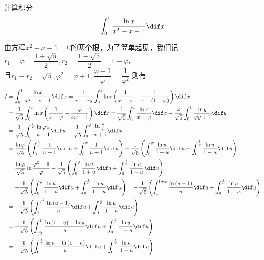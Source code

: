 \documentclass[color=green,titlestyle=hang]{elegantbook}%
\begin{document}
\newpage\begin{exercise}计算积分\[\int_{0}^{1}{\frac{\ln{x}}{x^2-x-1}\dif x}\]
\end{exercise}\begin{Solution}由方程$x^2-x-1=0$的两个根，为了简单起见，我们记\\
$r_{1}=\varphi=\dfrac{1+\sqrt{5}}{2},r_{2}=\dfrac{1-\sqrt{5}}{2}=1-\varphi$,\\
且$r_{1}-r_{2}=\sqrt{5},\varphi^{2}=\varphi+1 , \dfrac{\varphi-1}{\varphi}=\dfrac{1}{\varphi^{2}}$
则有
\begin{align*} 
I&=\int_{0}^{1}{\frac{\ln{x}}{x^2-x-1}\dif x}=\frac{1}{r_{1}-r_{2}}\int_{0}^{1}{\ln{x}\left(\frac{1}{x-\varphi}-\frac{1}{x-(1-\varphi)} \right)\dif x}\\ 
&=\dfrac{1}{\sqrt{5}}\int_{0}^{1}{\ln{x}\left(\frac{1}{x-\varphi}-\frac{\varphi}{\varphi x+1}\right)\dif x}=\dfrac{1}{\sqrt{5}}\int_{0}^{1}{\frac{\ln{x}}{x-\varphi}\dif x}-\frac{\varphi}{\sqrt{5}}\int_{0}^{1}{\frac{\ln{y}}{\varphi y+1}\dif y}\\ 
&=\frac{1}{\sqrt{5}}\int_{0}^{\frac{1}{\varphi}}{\frac{\ln{\varphi u}}{u-1}\dif u}-\frac{1}{\sqrt{5}}\int_{0}^{\varphi}{\frac{\ln{\frac{u}{\varphi}}}{u+1}\dif u}\\ 
&=\frac{\ln{\varphi}}{\sqrt{5}}\left(\int_{0}^{\frac{1}{\varphi}}{\frac{1}{u-1}\dif u}+\int_{0}^{\varphi}{\frac{1}{u+1}\dif u} \right)-\frac{1}{\sqrt{5}}\left(\int_{0}^{\varphi}{\frac{\ln{u}}{1+u}\dif u}+\int_{0}^{\frac{1}{\varphi}}{\frac{\ln{u}}{1-u}\dif u} \right)\\ 
&=\frac{\ln{\varphi}}{\sqrt{5}}\ln{\frac{\varphi^{2}-1}{\varphi}}-\frac{1}{\sqrt{5}}\left(\int_{0}^{\varphi}{\frac{\ln{u}}{1+u}\dif u}+\int_{0}^{\frac{1}{\varphi}}{\frac{\ln{u}}{1-u}\dif u} \right)\\ 
&=-\frac{1}{\sqrt{5}}\left(\int_{0}^{\varphi}{\frac{\ln{u}}{1+u}\dif u}+\int_{0}^{\frac{1}{\varphi}}{\frac{\ln{u}}{1-u}\dif u} \right)=-\frac{1}{\sqrt{5}}\left(\int_{1}^{1+\varphi}{\frac{\ln{(u-1)}}{u}\dif u}+\int_{0}^{\frac{1}{\varphi}}{\frac{\ln{u}}{1-u}\dif u}  \right)\\ 
&=-\frac{1}{\sqrt{5}}\left(\int_{1}^{\varphi^{2}}{\frac{\ln{(u-1)}}{u}\dif u}+\int_{0}^{\frac{1}{\varphi}}{\frac{\ln{u}}{1-u}\dif u}  \right)\\ 
&=-\frac{1}{\sqrt{5}}\left(\int_{\frac{1}{\varphi^{2}}}^{1}{\frac{\ln{(1-u)}-\ln{u}}{u}\dif u}+\int_{0}^{\frac{1}{\varphi}}{\frac{\ln{u}}{1-u}\dif u}  \right)\\ 
&=-\frac{1}{\sqrt{5}}\left(\int_{0}^{\frac{1}{\varphi}}{\frac{\ln{u}-\ln{(1-u)}}{u}\dif u}+\int_{0}^{\frac{1}{\varphi}}{\frac{\ln{u}}{1-u}\dif u}  \right)\\ 

\end{align*}
\end{Solution}
\end{document}
